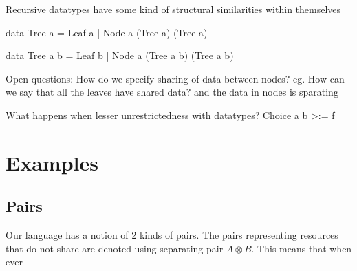 Recursive datatypes have some kind of structural similarities within themselves

data Tree a = Leaf a | Node a (Tree a) (Tree a)

data Tree a b = Leaf b | Node a (Tree a b) (Tree a b)

Open questions:
How do we specify sharing of data between nodes?
eg. How can we say that all the leaves have shared data? and the data in nodes is sparating


What happens when lesser unrestrictedness with datatypes? Choice a b >:= f


\section{Examples}

\subsection{Pairs}

Our language has a notion of 2 kinds of pairs. The pairs representing resources that do not share
are denoted using separating pair $A \otimes B$. This means that when ever 



